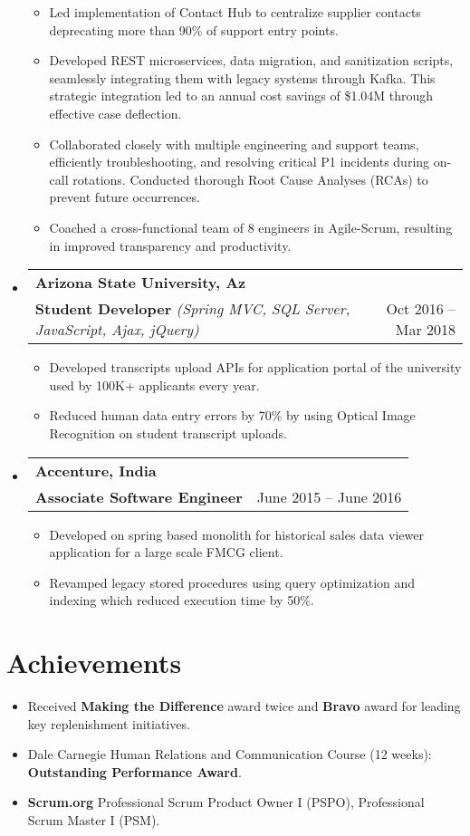 \documentclass[a4paper,10pt]{article}
\makeatletter
\newcommand{\resumeItem}[1]{\item #1}
\newcommand{\resumeSubheading}[4]{
  \vspace{-1pt}\item[]
    \begin{tabular*}{\textwidth}[t]{l@{\extracolsep{\fill}}r}
      \textbf{#1} & #2 \\
      \vspace{2pt}
      {#3} & {#4} \\
    \end{tabular*}\vspace{-5pt}
}
\newcommand{\resumeSubItem}[1]{\resumeItem{#1}\vspace{-4pt}}
\makeatother
\begin{document}
\begin{itemize}[leftmargin=0.15in, label={}]
    \begin{itemize}
        \resumeSubItem{Led implementation of Contact Hub to centralize supplier contacts deprecating more than 90\% of support entry points.}
        \resumeSubItem{Developed REST microservices, data migration, and sanitization scripts, seamlessly integrating them with legacy systems through Kafka. This strategic integration led to an annual cost savings of \$1.04M through effective case deflection.}
        \resumeSubItem{Collaborated closely with multiple engineering and support teams, efficiently troubleshooting, and resolving critical P1 incidents during on-call rotations. Conducted thorough Root Cause Analyses (RCAs) to prevent future occurrences.}
        \resumeSubItem{Coached a cross-functional team of 8 engineers in Agile-Scrum, resulting in improved transparency and productivity.}
    \end{itemize}
    \vspace{0.2cm}
    \resumeSubheading{\large Arizona State University, Az}{}{\textcolor{mygray}{\textbf{Student Developer}} \textit{(Spring MVC, SQL Server, JavaScript, Ajax, jQuery)}}{Oct 2016 -- Mar 2018}
    \begin{itemize}
        \resumeSubItem{Developed transcripts upload APIs for application portal of the university used by 100K+ applicants every year.}
        \resumeSubItem{Reduced human data entry errors by 70\% by using Optical Image Recognition on student transcript uploads.}
    \end{itemize}
    \vspace{0.2cm}
    \resumeSubheading{\large Accenture, India}{}{\textcolor{mygray}{\textbf{Associate Software Engineer}}}{June 2015 -- June 2016}
    \begin{itemize}
        \resumeSubItem{Developed on spring based monolith for historical sales data viewer application for a large scale FMCG client.}
        \resumeSubItem{Revamped legacy stored procedures using query optimization and indexing which reduced execution time by 50\%.}
    \end{itemize}
\end{itemize}

\section{Achievements}
\begin{itemize}[leftmargin=0.15in, label={}]
    \resumeSubItem {Received \textbf{Making the Difference} award twice and \textbf{Bravo} award for leading key replenishment initiatives.}
    \resumeSubItem {Dale Carnegie Human Relations and Communication Course (12 weeks): \textbf{Outstanding Performance Award}.}
    \resumeSubItem {\textbf{Scrum.org} Professional Scrum Product Owner I (PSPO), Professional Scrum Master I (PSM).}
\end{itemize}
\end{document}
